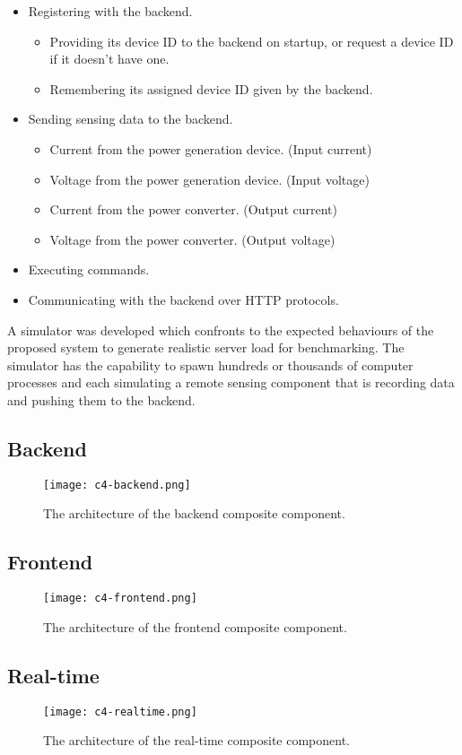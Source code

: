\documentclass[../thesis.tex]{subfiles}
\begin{document}
\begin{itemize}
	\item Registering with the backend.
	\begin{itemize}
		\item Providing its device ID to the backend on startup, or request a device ID if it doesn't have one. 
		\item Remembering its assigned device ID given by the backend. 
	\end{itemize}
	\item Sending sensing data to the backend.
	\begin{itemize}
		\item Current from the power generation device. (Input current)
		\item Voltage from the power generation device. (Input voltage)
		\item Current from the power converter. (Output current)
		\item Voltage from the power converter. (Output voltage)
	\end{itemize}
	\item Executing commands.
	\item Communicating with the backend over HTTP protocols.
\end{itemize}

A simulator was developed which confronts to the expected behaviours of the proposed system to generate realistic server load for benchmarking. The simulator has the capability to spawn hundreds or thousands of computer processes and each simulating a remote sensing component that is recording data and pushing them to the backend.


\subsection{Backend}
\label{sec:backend}

\begin{figure}[!ht]
	\centering
	\texttt{[image: c4-backend.png]}
	\caption{The architecture of the backend composite component.}
	\label{fig:backend}
\end{figure}

\subsection{Frontend}
\label{sec:frontend}

\begin{figure}[!ht]
	\centering
	\texttt{[image: c4-frontend.png]}
	\caption{The architecture of the frontend composite component.}
	\label{fig:frontend}
\end{figure}


\subsection{Real-time}
\label{sec:realtime}

\begin{figure}[!ht]
	\centering
	\texttt{[image: c4-realtime.png]}
	\caption{The architecture of the real-time composite component.}
	\label{fig:realtime}
\end{figure}
\end{document}
